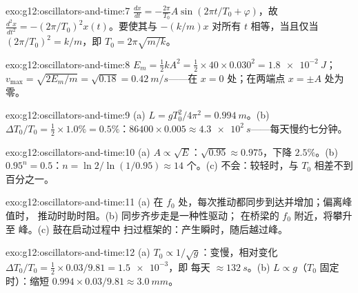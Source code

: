 \begin{solution}{exo:g12:oscillators-and-time:7}
$\frac{dx}{dt} = -\frac{2\pi}{T_0}A\sin(2\pi t/T_0 + \varphi)$，故
$\frac{d^2x}{dt^2} = -(2\pi/T_0)^2 x(t)$。要使其与 $-(k/m)x$
对所有 $t$ 相等，当且仅当 $(2\pi/T_0)^2 = k/m$，即
$T_0 = 2\pi\sqrt{m/k}$。
\end{solution}

\begin{solution}{exo:g12:oscillators-and-time:8}
$E_m = \tfrac12 kA^2 = \tfrac12 \times 40 \times 0.030^2 =
\qty{1.8e-2}{J}$；$v_{\max} = \sqrt{2E_m/m} = \sqrt{0.18} =
\qty{0.42}{m/s}$——在 $x = 0$ 处；在两端点 $x = \pm A$ 处为零。
\end{solution}

\begin{solution}{exo:g12:oscillators-and-time:9}
(a) $L = gT_0^2/4\pi^2 = \qty{0.994}{m}$。(b) $\Delta T_0/T_0 =
\tfrac12 \times 1.0\% = 0.5\%$：$86400 \times 0.005 \approx
\qty{4.3e2}{s}$——每天慢约七分钟。
\end{solution}

\begin{solution}{exo:g12:oscillators-and-time:10}
(a) $A \propto \sqrt{E}$：$\sqrt{0.95} \approx 0.975$，下降
$2.5\%$。(b) $0.95^n = 0.5$：$n = \ln 2/\ln(1/0.95) \approx 14$
个。(c) 不会：较轻时，与
$T_0$ 相差不到百分之一。
\end{solution}

\begin{solution}{exo:g12:oscillators-and-time:11}
(a) 在 $f_0$ 处，每次推动都同步到达并增加；偏离峰值时，
推动时助时阻。(b) 同步齐步走是一种性驱动；
在桥梁的 $f_0$ 附近，将攀升至
峰。(c) 鼓在启动过程中
扫过框架的：产生瞬时，随后越过峰。
\end{solution}

\begin{solution}{exo:g12:oscillators-and-time:12}
(a) $T_0 \propto 1/\sqrt{g}$：变慢，相对变化 $\Delta T_0/T_0 = \tfrac12
\times 0.03/9.81 = \num{1.5e-3}$，即
每天 $\approx \qty{132}{s}$。(b) $L \propto g$（$T_0$ 固定时）：缩短 $0.994 \times
0.03/9.81 \approx \qty{3.0}{mm}$。
\end{solution}

